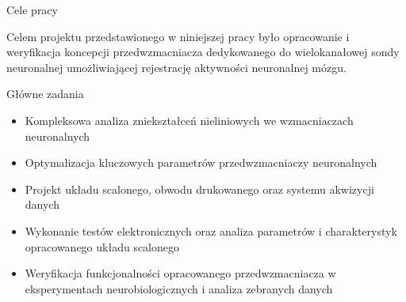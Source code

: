 \begin{frame}{Cele pracy}

    \begin{alertblock}{}
        Celem projektu przedstawionego w niniejszej pracy było opracowanie i weryfikacja koncepcji przedwzmacniacza dedykowanego do wielokanałowej sondy neuronalnej umożliwiającej rejestrację aktywności neuronalnej mózgu.
    \end{alertblock}

    \begin{block}{Główne zadania}
        \begin{itemize}
            \item Kompleksowa analiza zniekształceń nieliniowych we wzmacniaczach neuronalnych
            \item Optymalizacja kluczowych parametrów przedwzmacniaczy neuronalnych
            \item  Projekt układu scalonego, obwodu drukowanego oraz systemu akwizycji danych
            \item Wykonanie testów elektronicznych oraz analiza parametrów i charakterystyk opracowanego układu scalonego
            \item Weryfikacja funkcjonalności opracowanego przedwzmacniacza  w eksperymentach neurobiologicznych i analiza zebranych danych
        \end{itemize}
    \end{block}

    
\end{frame}

